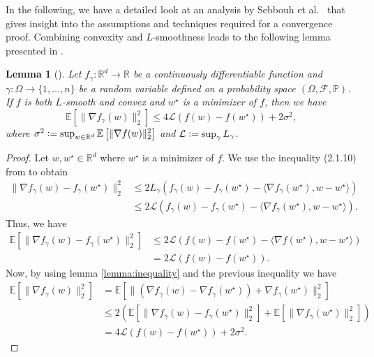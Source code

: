 \documentclass[12pt]{article}
\newtheorem{lemma}[lemma]{Lemma}
\theoremstyle{definition}
\numberwithin{equation}{section}
\newcommand{\R}{\mathbb{R}}
\newcommand{\BP}{\mathbb{P}}
\newcommand{\CF}{\mathcal{F}}
\newcommand{\CL}{\mathcal{L}}
\newcommand{\ev}[1]{\mathbb{E}\left[{#1}\right]}
\newcommand{\norm}[1]{\lVert{#1}\rVert_2}
\newcommand{\defeq}{\vcentcolon=}
\begin{document}
In the following, we have a detailed look at an analysis by Sebbouh et al.\ \autocite{sebbouhAlmostSureConvergence2021} that gives insight into the assumptions and techniques required for a convergence proof.
Combining convexity and $L$-smoothness leads to the following lemma presented in \autocite{sebbouhAlmostSureConvergence2021}.
\begin{lemma}[]
  \label{lemma:gradient_inequality}
  Let $f_{\gamma} : \R^d \rightarrow \R$ be a continuously differentiable function and $\gamma : \Omega \rightarrow \{1,\dots,n\}$ be a random variable defined on a probability space $(\Omega, \CF, \BP)$. If $f$ is both $L$-smooth and convex and $w^\star$ is a minimizer of $f$, then we have
  \begin{equation}
    \ev{\norm{\nabla f_{\gamma}(w)}^2} \leq 4 \CL (f(w) - f(w^\star)) + 2 \sigma^2,
  \end{equation}
  where $\sigma^2 \defeq \sup_{w \in \R^d} \ev{\norm{\nabla f(w)}^2}$ and $\CL \defeq \sup_{\gamma} L_{\gamma}$.
\end{lemma}
\begin{proof}
  Let $w, w^\star \in \R^d$ where $w^\star$ is a minimizer of $f$. We use the inequality (2.1.10) from \autocite{nesterovLecturesConvexOptimization2018} to obtain
  \begin{align*}
    \norm{\nabla f_{\gamma}(w) - f_{\gamma}(w^\star)}^2 &\leq 2L_{\gamma}(f_{\gamma}(w) - f_{\gamma}(w^\star) - \langle \nabla f_{\gamma}(w^\star), w - w^\star \rangle) \\
    &\leq 2\CL(f_{\gamma}(w) - f_{\gamma}(w^\star) - \langle \nabla f_{\gamma}(w^\star), w - w^\star \rangle).
  \end{align*}
  Thus, we have
  \begin{align*}
    \ev{\norm{\nabla f_{\gamma}(w) - f_{\gamma}(w^\star)}^2 } &\leq 2\CL(f(w) - f(w^\star) - \langle \nabla f(w^\star), w - w^\star \rangle) \\
    &= 2\CL(f(w) - f(w^\star)).
  \end{align*}
  Now, by using lemma \autoref{lemma:inequality} and the previous inequality we have
  \begin{align*}
    \ev{\norm{\nabla f_{\gamma}(w)}^2} &= \ev{\norm{(\nabla f_{\gamma}(w) - \nabla f_{\gamma}(w^\star)) + \nabla f_{\gamma}(w^\star)}^2} \\
    &\leq 2( \ev{\norm{\nabla f_{\gamma}(w) - f_{\gamma}(w^\star)}^2 } + \ev{\norm{\nabla f_{\gamma}(w^\star)}^2}) \\
    &= 4\CL(f(w) - f(w^\star)) + 2\sigma^2.
  \end{align*}
\end{proof}
\end{document}
